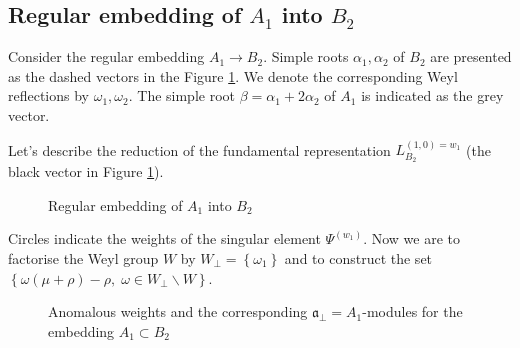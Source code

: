 \documentclass[12pt]{iopart}
\theoremstyle{definition}
\theoremstyle{definition}
\theoremstyle{definition}
\begin{document}
\subsection{Regular embedding of $A_1$ into $B_2$}
\label{sec:regul-embedd-a_1}

Consider the regular embedding $A_1\to B_2$. Simple roots $\alpha_1, \alpha_2$ of $B_2$ are presented as the dashed vectors in the Figure \ref{fig:B2_A1}. We denote the corresponding Weyl reflections by $\omega_1, \omega_2$. The simple root $\beta = \alpha_1+2\alpha_2$ of $A_1$ is indicated as the grey vector.

Let's describe the reduction of the fundamental representation $L^{(1,0)=w_1}_{B_2}$ (the black vector in Figure \ref{fig:B2_A1}).
\begin{figure}[th]
  \noindent{}
  \caption{Regular embedding of $A_1$ into $B_2$}
  \label{fig:B2_A1}
\end{figure}
Circles indicate the weights of the singular element $\Psi^{(w_1)}$.
Now we are to factorise the Weyl group $W$ by $W_{\bot}=\left\{\omega_1\right\}$
and to construct the set $\left\{\omega(\mu+\rho)-\rho,\; \omega\in W_{\bot}\backslash W\right\}$.
\begin{figure}[t]
  \noindent{}
  \caption{Anomalous weights and the corresponding $\mathfrak{a}_{\bot}=A_1$-modules for the embedding $A_1\subset B_2$}
  \label{fig:B2_A1_2}
\end{figure}
\end{document}
